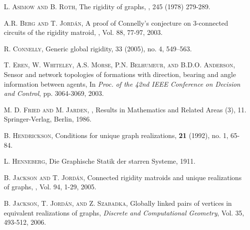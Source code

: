 \documentclass[11pt]{article}
\begin{document}
\begin{thebibliography}{99}
\iffalse
{} {\scshape
L. Asimow and B. Roth},
\newblock The rigidity of graphs,
, 245 (1978) 279-289.

 {\scshape
A.R. Berg and T. Jord\'an},
\newblock A proof of Connelly's conjecture
on $3$-connected circuits of the rigidity matroid,
, Vol. 88, 77-97, 2003.


 {\scshape R. Connelly},
\newblock
Generic global rigidity,
 33 (2005), no. 4,
549--563.

 {\scshape T. Eren, W. Whiteley,
A.S. Morse, P.N. Belhumeur, and B.D.O. Anderson},
\newblock Sensor and network topologies of formations
with direction, bearing and angle information between
agents,
\newblock In {\it Proc. of the 42nd IEEE Conference on Decision
and Control}, pp. 3064-3069, 2003.


 {\scshape M. D. Fried and M. Jarden},
, Results in Mathematics
and Related Areas (3), 11. Springer-Verlag, Berlin, 1986.


 {\scshape B. Hendrickson},
\newblock Conditions for unique graph realizations,
 {\bfseries 21} (1992), no. 1, 65-84.

 {\scshape L. Henneberg}, Die Graphische Statik der
starren Systeme, 1911.

 {\scshape B. Jackson and T. Jord\'an},
\newblock Connected rigidity matroids and unique realizations
of graphs,
, Vol. 94, 1-29, 2005.

 {\scshape B. Jackson, T. Jord\'an, and Z. Szabadka},
Globally linked pairs of vertices in equivalent realizations
of graphs,
{\itshape Discrete and Computational Geometry},
Vol. 35, 493-512, 2006.


\end{thebibliography}
\end{document}
